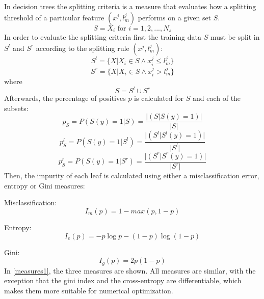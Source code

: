  In decision trees the splitting criteria is a measure that evaluates how a splitting threshold of 
a particular feature
 $(x^j,l^j_m)$ performs on a given set $S$.
\begin{equation}
 S = X_i\mbox{ for }  i=1,2,...,N_s
\end{equation}
 In order to evaluate the splitting criteria first the training data $S$ must be split in $S^l$ and 
$S^r$ 
 according to the splitting rule $(x^j,l^j_m)$:
 \begin{equation}
 S^l = \{X \vert X_i \in S \wedge x^j_i \le l^j_m \}
 \end{equation}
 \begin{equation}
 S^r = \{X \vert X_i \in S \wedge x^j_i > l^j_m \}
 \end{equation}
  where
 \begin{equation}
 S = S^l \cup S^r
 \end{equation}
 Afterwards, the percentage of positives $p$ is calculated for $S$ and each of the subsets:
  \begin{equation}
 p_S= P(S(y)= 1\vert S)=\frac{\vert (S\vert S(y)=1) \vert}{\vert S \vert}
 \end{equation}
 \begin{equation}
 p^l_S= P(S(y)= 1\vert S^l)=\frac{\vert (S^l\vert S^l(y)=1) \vert}{\vert S^l \vert}
 \end{equation}
 \begin{equation}
 p^r_S= P(S(y)= 1\vert S^r)=\frac{\vert (S^r\vert S^r(y)=1) \vert}{\vert S^r \vert}
 \end{equation} 
  Then, the impurity of each leaf is calculated using either a misclassification error, entropy or 
Gini measures:
 \vspace{10pt}

 Misclassification:
 \begin{equation}
 I_m(p)=1-max(p,1-p)
 \end{equation}

 Entropy:
 \begin{equation}
 I_e(p)=-p\log p -(1-p) \log (1-p)
 \end{equation}
 
 Gini:
 \begin{equation}
 I_g(p)=2p(1-p)
 \end{equation}
 In \figurename{ \ref{measures1}}, the three measures are shown. All measures are similar, with the 
 exception that the gini index and the cross-entropy are differentiable, which makes them
 more suitable for numerical optimization.
 \vspace{10pt}

